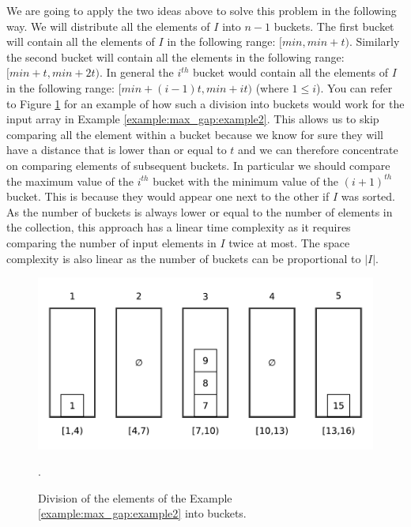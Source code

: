 We are going to apply the two ideas above to solve this problem in the following way. We will
distribute all the elements of $I$ into $n-1$ buckets. The first bucket will contain all the
elements of $I$ in the following range: $[min, min + t)$. Similarly the second bucket will contain
all the elements in the following range: $[min + t, min + 2t)$. In general the $i^{th}$ bucket
would contain all the elements of $I$ in the following range: $[min + (i-1)t, min+it)$ (where $ 1
\leq i$). You can refer to Figure \ref{fig:max_gap:bucketing_example2} for an example of how such a
division into buckets would work for the input array in Example \ref{example:max_gap:example2}. This
allows us to skip comparing all the element within a bucket because we know for sure they will have
a distance that is lower than or equal to $t$ and we can therefore concentrate on comparing
elements of subsequent buckets. In particular we should compare the maximum value of the $i^{th}$
bucket with the minimum value of the $(i+1)^{th}$ bucket. This is because they would appear one next to
the other if $I$ was sorted. As the number of buckets is always lower or equal to the number
of elements in the collection, this approach has a linear time complexity as it requires 
comparing the number of input elements in $I$ twice at most. The space complexity is also linear as
the number of buckets can be proportional to $|I|$.
\begin{figure}
	\centering
	\includegraphics[width=\textwidth]{sources/max_gap/images/bucketing_example1}
	\caption{Division of the elements of the Example \ref{example:max_gap:example2} into buckets.}.
	\label{fig:max_gap:bucketing_example2}
\end{figure}


